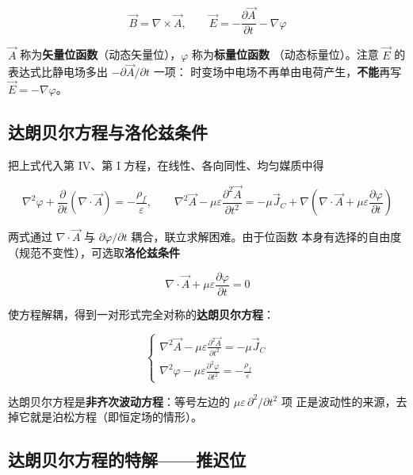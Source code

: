 \begin{formulaBox}
\[
\vec{B}=\nabla\times\vec{A},
\qquad
\vec{E}=-\frac{\partial \vec{A}}{\partial t}-\nabla\varphi
\]
\end{formulaBox}

$\vec{A}$ 称为\textbf{矢量位函数}（动态矢量位），$\varphi$ 称为\textbf{标量位函数}
（动态标量位）。注意 $\vec{E}$ 的表达式比静电场多出 $-\partial\vec{A}/\partial t$ 一项：
时变场中电场不再单由电荷产生，\textbf{不能}再写 $\vec{E}=-\nabla\varphi$。

\subsection{达朗贝尔方程与洛伦兹条件}

把上式代入第 IV、第 I 方程，在线性、各向同性、均匀媒质中得

\begin{formulaBox}
\[
\nabla^2\varphi+\frac{\partial}{\partial t}(\nabla\cdot\vec{A})=-\frac{\rho_f}{\varepsilon},
\qquad
\nabla^2\vec{A}-\mu\varepsilon\frac{\partial^2\vec{A}}{\partial t^2}
=-\mu\vec{J}_C+\nabla\left(\nabla\cdot\vec{A}+\mu\varepsilon\frac{\partial\varphi}{\partial t}\right)
\]
\end{formulaBox}

两式通过 $\nabla\cdot\vec{A}$ 与 $\partial\varphi/\partial t$ 耦合，联立求解困难。由于位函数
本身有选择的自由度（规范不变性），可选取\textbf{洛伦兹条件}
\begin{formulaBox}
\[
\nabla\cdot\vec{A}+\mu\varepsilon\frac{\partial\varphi}{\partial t}=0
\]
\end{formulaBox}
使方程解耦，得到一对形式完全对称的\textbf{达朗贝尔方程}：
\begin{formulaBox}
\[
\begin{cases}
\displaystyle\nabla^2\vec{A}-\mu\varepsilon\frac{\partial^2\vec{A}}{\partial t^2}=-\mu\vec{J}_C\\[10pt]
\displaystyle\nabla^2\varphi-\mu\varepsilon\frac{\partial^2\varphi}{\partial t^2}
=-\frac{\rho_f}{\varepsilon}
\end{cases}
\]
\end{formulaBox}

达朗贝尔方程是\textbf{非齐次波动方程}：等号左边的 $\mu\varepsilon\,\partial^2/\partial t^2$ 项
正是波动性的来源，去掉它就是泊松方程（即恒定场的情形）。

\subsection{达朗贝尔方程的特解——推迟位}

